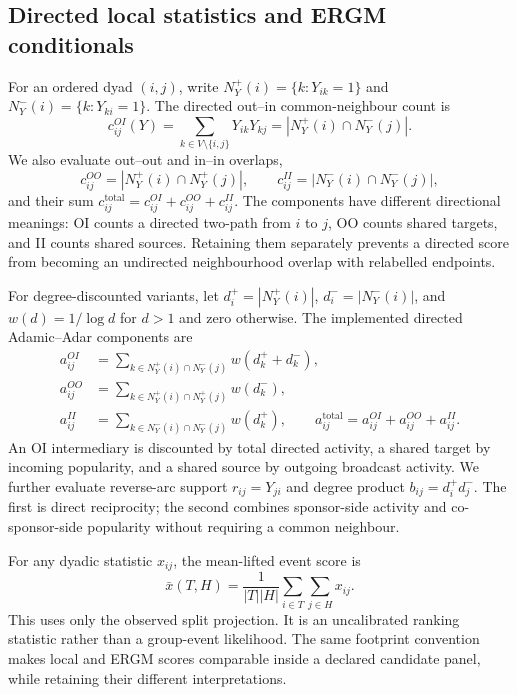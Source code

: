 \documentclass{nws}
\begin{document}
\subsection{Directed local statistics and ERGM conditionals}

For an ordered dyad $(i,j)$, write $N_Y^+(i)=\{k:Y_{ik}=1\}$ and $N_Y^-(i)=\{k:Y_{ki}=1\}$. The directed out--in common-neighbour count is
\begin{equation}
 c_{ij}^{OI}(Y)=\sum_{k\in V\setminus\{i,j\}}Y_{ik}Y_{kj}
 =|N_Y^+(i)\cap N_Y^-(j)|.
 \label{eq:oi}
\end{equation}
We also evaluate out--out and in--in overlaps,
\begin{equation}
 c_{ij}^{OO}=|N_Y^+(i)\cap N_Y^+(j)|,
 \qquad
 c_{ij}^{II}=|N_Y^-(i)\cap N_Y^-(j)|,
 \label{eq:directed-overlaps}
\end{equation}
and their sum $c_{ij}^{\mathrm{total}}=c_{ij}^{OI}+c_{ij}^{OO}+c_{ij}^{II}$. The components have different directional meanings: OI counts a directed two-path from $i$ to $j$, OO counts shared targets, and II counts shared sources. Retaining them separately prevents a directed score from becoming an undirected neighbourhood overlap with relabelled endpoints.

For degree-discounted variants, let $d_i^+=|N_Y^+(i)|$, $d_i^-=|N_Y^-(i)|$, and $w(d)=1/\log d$ for $d>1$ and zero otherwise. The implemented directed Adamic--Adar components are
\begin{align}
 a_{ij}^{OI}&=\sum_{k\in N_Y^+(i)\cap N_Y^-(j)}w(d_k^++d_k^-),\\
 a_{ij}^{OO}&=\sum_{k\in N_Y^+(i)\cap N_Y^+(j)}w(d_k^-),\\
 a_{ij}^{II}&=\sum_{k\in N_Y^-(i)\cap N_Y^-(j)}w(d_k^+),
 \qquad a_{ij}^{\mathrm{total}}=a_{ij}^{OI}+a_{ij}^{OO}+a_{ij}^{II}.
 \label{eq:directed-aa}
\end{align}
An OI intermediary is discounted by total directed activity, a shared target by incoming popularity, and a shared source by outgoing broadcast activity. We further evaluate reverse-arc support $r_{ij}=Y_{ji}$ and degree product $b_{ij}=d_i^+d_j^-$. The first is direct reciprocity; the second combines sponsor-side activity and co-sponsor-side popularity without requiring a common neighbour.

For any dyadic statistic $x_{ij}$, the mean-lifted event score is
\begin{equation}
 \bar{x}(T,H)=\frac{1}{|T||H|}\sum_{i\in T}\sum_{j\in H}x_{ij}.
 \label{eq:local-score-lift}
\end{equation}
This uses only the observed split projection. It is an uncalibrated ranking statistic rather than a group-event likelihood. The same footprint convention makes local and ERGM scores comparable inside a declared candidate panel, while retaining their different interpretations.
\end{document}
